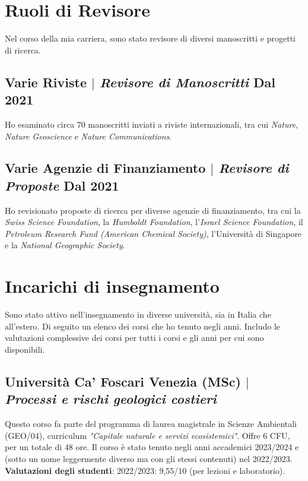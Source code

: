 \documentclass[11pt]{article}
\begin{document}
\section{Ruoli di Revisore}
{\normalfont Nel corso della mia carriera, sono stato revisore di diversi manoscritti e progetti di ricerca.}\\
\bigskip

\subsection{Varie Riviste $|$ {\normalfont\textit{Revisore di Manoscritti}} \hfill Dal 2021}
{\footnotesize Ho esaminato circa 70 manoscritti inviati a riviste internazionali, tra cui \textit{Nature}, \textit{Nature Geoscience} e \textit{Nature Communications}.}
\bigskip

\subsection{Varie Agenzie di Finanziamento $|$ {\normalfont\textit{Revisore di Proposte}} \hfill Dal 2021}
{\footnotesize Ho revisionato proposte di ricerca per diverse agenzie di finanziamento, tra cui la \textit{Swiss Science Foundation}, la \textit{Humboldt Foundation}, l'\textit{Israel Science Foundation}, il \textit{Petroleum Research Fund (American Chemical Society)}, l'Università di Singapore e la \textit{National Geographic Society}.}

\newpage

\section{Incarichi di insegnamento}
{\normalfont Sono stato attivo nell'insegnamento in diverse università, sia in Italia che all'estero. Di seguito un elenco dei corsi che ho tenuto negli anni. Includo le valutazioni complessive dei corsi per tutti i corsi e gli anni per cui sono disponibili.}\\

\bigskip
\subsection{Università Ca' Foscari Venezia (MSc) $|$ {\normalfont\textit{Processi e rischi geologici costieri}}}
{\footnotesize Questo corso fa parte del programma di laurea magistrale in Scienze Ambientali (GEO/04), curriculum \textit{"Capitale naturale e servizi ecosistemici"}. Offre 6 CFU, per un totale di 48 ore. Il corso è stato tenuto negli anni accademici 2023/2024 e (sotto un nome leggermente diverso ma con gli stessi contenuti) nel 2022/2023.\\
\textbf{Valutazioni degli studenti}: 2022/2023: 9,55/10 (per lezioni e laboratorio).}
\bigskip
\end{document}
